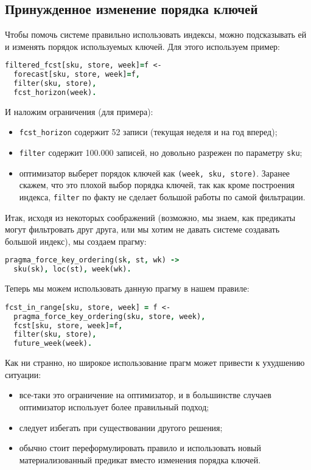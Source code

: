 \subsection{Принужденное изменение порядка ключей}
\label{sec:optimization:key_ordering}

Чтобы помочь системе правильно использовать индексы, можно подсказывать ей и изменять порядок используемых ключей. Для этого используем пример:

\begin{lstlisting}[language=Prolog]
filtered_fcst[sku, store, week]=f <-
  forecast[sku, store, week]=f,
  filter(sku, store),
  fcst_horizon(week).
\end{lstlisting}

И наложим ограничения (для примера):

\begin{itemize}
  \item \lstinline{fcst_horizon} содержит 52 записи (текущая неделя и на год вперед);
  \item \lstinline{filter} содержит 100.000 записей, но довольно разрежен по параметру \lstinline{sku};
  \item оптимизатор выберет порядок ключей как \lstinline{(week, sku, store)}. Заранее скажем, что это плохой выбор порядка ключей, так как кроме построения индекса, \lstinline{filter} по факту не сделает большой работы по самой фильтрации.
\end{itemize}

Итак, исходя из некоторых соображений (возможно, мы знаем, как предикаты могут фильтровать друг друга, или мы хотим не давать системе создавать большой индекс), мы создаем прагму:

\begin{lstlisting}[language=Prolog]
pragma_force_key_ordering(sk, st, wk) ->
  sku(sk), loc(st), week(wk).
\end{lstlisting}

Теперь мы можем использовать данную прагму в нашем правиле:

\begin{lstlisting}[language=Prolog]
fcst_in_range[sku, store, week] = f <-
  pragma_force_key_ordering(sku, store, week),
  fcst[sku, store, week]=f,
  filter(sku, store),
  future_week(week).
\end{lstlisting}

Как ни странно, но широкое использование прагм может привести к ухудшению ситуации:

\begin{itemize}
  \item все-таки это ограничение на оптимизатор, и в большинстве случаев оптимизатор использует более правильный подход;
  \item следует избегать при существовании другого решения;
  \item обычно стоит переформулировать правило и использовать новый материализованный предикат вместо изменения порядка ключей.
\end{itemize}
